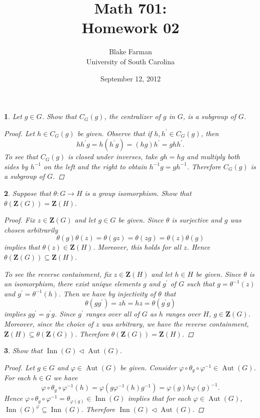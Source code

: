 \documentclass[10pt]{amsart}
\author{Blake Farman\\University of South Carolina}
\title{Math 701:\\Homework 02}
\date{September 12, 2012}
\begin{document}
\maketitle

\newcommand{\Inn}[1]{\operatorname{Inn}(#1)}
\newcommand{\Aut}[1]{\operatorname{Aut}(#1)}
\newcommand{\cntr}[1]{\mathbf{Z}(#1)}

\newtheorem{thm}{}
\newtheorem{lem}{Lemma}

\begin{thm}
  Let $g \in G$.  Show that $C_G(g)$, the centralizer of $g$ in $G$, is a subgroup of $G$.
  \begin{proof}
    Let $h \in C_G(g)$ be given.
    Observe that if $h,h^{\prime} \in C_G(g)$, then $$hh^{\prime}g = h(h^{\prime}g) = (hg)h^{\prime} = ghh^{\prime}.$$
    To see that $C_G(g)$ is closed under inverses, take $gh = hg$ and multiply both sides by $h^{-1}$ on the left and the right to obtain $h^{-1}g = gh^{-1}$.
    Therefore $C_G(g)$ is a subgroup of $G$.
  \end{proof}
\end{thm}

\begin{thm}
  Suppose that $\theta:G \rightarrow H$ is a group isomorphism.  Show that $\theta(\cntr{G}) = \cntr{H}$.
  \begin{proof}
    Fix $z \in \cntr{G}$ and let $g \in G$ be given.
    Since $\theta$ is surjective and $g$ was chosen arbitrarily $$\theta(g)\theta(z) = \theta(gz) = \theta(zg) = \theta(z)\theta(g)$$
    implies that $\theta(z) \in \cntr{H}$.
    Moreover, this holds for all $z$.
    Hence $\theta(\cntr{G}) \subseteq \cntr{H}$.
    
    To see the reverse containment, fix $z \in \cntr{H}$ and let $h \in H$ be given.  
    Since $\theta$ is an isomorphism, there exist unique elements $g$ and $g^{\prime}$ of $G$ such that $g = \theta^{-1}(z)$ and $g^{\prime} = \theta^{-1}(h)$.
    Then we have by injectivity of $\theta$ that
    $$\theta(gg^{\prime}) = zh = hz = \theta(g^{\prime}g)$$
    implies $gg^{\prime} = g^{\prime}g$.
    Since $g^{\prime}$ ranges over all of $G$ as $h$ ranges over $H$, $g \in \cntr{G}$.
    Moreover, since the choice of $z$ was arbitrary, we have the reverse containment, $\cntr{H} \subseteq \theta(\cntr{G})$.
    Therefore $\theta(\cntr{G}) = \cntr{H}$.
  \end{proof}
\end{thm}

\begin{thm}
  Show that $\Inn{G} \lhd \Aut{G}$.
  \begin{proof}
	\newcommand{\p}{\varphi \circ \theta_g \circ \varphi^{-1}}
	Let $g \in G$ and $\varphi \in \Aut{G}$ be given.
	Consider $\p \in \Aut{G}$.
	For each $h \in G$ we have $$\p (h) = \varphi(g\varphi^{-1}(h)g^{-1}) = \varphi(g)h\varphi(g)^{-1}.$$
	Hence $\p = \theta_{\varphi(g)} \in \Inn{G}$ implies that for each $\varphi \in \Aut{G}$, $\Inn{G}^{\varphi} \subseteq \Inn{G}$.
	Therefore $\Inn{G} \lhd \Aut{G}$.
  \end{proof}
\end{thm}
\end{document}
